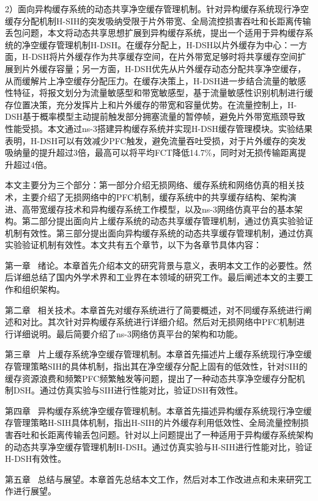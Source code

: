 
2）面向异构缓存系统的动态共享净空缓存管理机制。针对异构缓存系统现行净空缓存分配机制H-SIH的突发吸纳受限于片外带宽、全局流控损害吞吐和长距离传输丢包问题，本文将动态共享思想扩展到异构缓存系统，提出一个适用于异构缓存系统的净空缓存管理机制H-DSH。在缓存分配上，H-DSH以片外缓存为中心：一方面，H-DSH将片外缓存作为共享缓存空间，在片外带宽足够时将共享缓存空间扩展到片外缓存容量；另一方面，H-DSH优先从片外缓存动态分配共享净空缓存，从而缓解片上净空缓存分配压力。在缓存决策上，H-DSH进一步结合流量的敏感性特征，将报文划分为流量敏感型和带宽敏感型，基于流量敏感性识别机制进行缓存位置决策，充分发挥片上和片外缓存的带宽和容量优势。在流量控制上，H-DSH基于概率模型主动提前触发部分拥塞流量的暂停帧，避免片外带宽瓶颈导致性能受损。本文通过ns-3搭建异构缓存系统并实现H-DSH缓存管理模块。实验结果表明，H-DSH可以有效减少PFC触发，避免流量吞吐受损，对于片外缓存的突发吸纳量的提升超过3倍，最高可以将平均FCT降低14.7\%，同时对无损传输距离提升超过4倍。


本文主要分为三个部分：第一部分介绍无损网络、缓存系统和网络仿真的相关技术，主要介绍了无损网络中的PFC机制，缓存系统中的共享缓存结构、架构演进、高带宽缓存技术和异构缓存系统工作模型，以及ns-3网络仿真平台的基本架构。第二部分提出面向片上缓存系统的动态共享缓存管理机制，通过仿真实验验证机制有效性。第三部分提出面向异构缓存系统的动态共享缓存管理机制，通过仿真实验验证机制有效性。本文共有五个章节，以下为各章节具体内容：

第一章 \ 绪论。本章首先介绍本文的研究背景与意义，表明本文工作的必要性。然后详细总结了国内外学术界和工业界在本领域的研究工作。最后阐述本文的主要工作和组织架构。

第二章 \ 相关技术。本章首先对缓存系统进行了简要概述，对不同缓存系统进行阐述和对比。其次针对异构缓存系统进行详细介绍。然后对无损网络中PFC机制进行详细说明。最后简要介绍了ns-3网络仿真平台的架构和功能。

第三章 \ 片上缓存系统净空缓存管理机制。本章首先描述片上缓存系统现行净空缓存管理策略SIH的具体机制，指出其在净空缓存分配上固有的低效性，针对SIH的缓存资源浪费和频繁PFC频繁触发等问题，提出了一种动态共享净空缓存分配机制DSH。通过仿真实验与SIH进行性能对比，验证DSH有效性。

第四章 \ 异构缓存系统净空缓存管理机制。本章首先描述异构缓存系统现行净空缓存管理策略H-SIH具体机制，指出H-SIH的片外缓存利用低效性、全局流量控制损害吞吐和长距离传输丢包问题。针对以上问题提出了一种适用于异构缓存系统架构的动态共享净空缓存管理机制H-DSH。通过仿真实验与H-SIH进行性能对比，验证H-DSH有效性。

第五章 \ 总结与展望。本章首先总结本文工作，然后对本工作改进点和未来研究工作进行展望。


\clearpage
